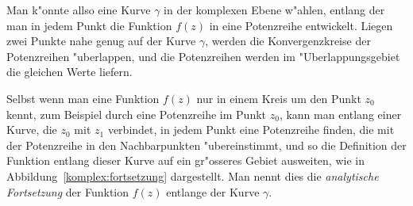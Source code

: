 Man k"onnte allso eine Kurve $\gamma$ in der komplexen Ebene w"ahlen,
entlang der man in jedem Punkt die Funktion $f(z)$ in eine Potenzreihe 
entwickelt.
Liegen zwei Punkte nahe genug auf der Kurve $\gamma$, werden die
Konvergenzkreise der Potenzreihen "uberlappen, und die Potenzreihen
werden im "Uberlappungsgebiet die gleichen Werte liefern.

Selbst wenn man eine Funktion $f(z)$ nur in einem Kreis um den Punkt $z_0$
kennt, zum Beispiel durch eine Potenzreihe im Punkt $z_0$, kann man entlang
einer Kurve, die $z_0$ mit $z_1$ verbindet, in jedem Punkt eine Potenzreihe
finden, die mit der Potenzreihe in den Nachbarpunkten "ubereinstimmt, und
so die Definition der Funktion entlang dieser Kurve auf ein gr"osseres
Gebiet ausweiten, wie in Abbildung~\ref{komplex:fortsetzung} dargestellt.
Man nennt dies die {\em analytische Fortsetzung} der Funktion $f(z)$ 
entlange der Kurve $\gamma$.

